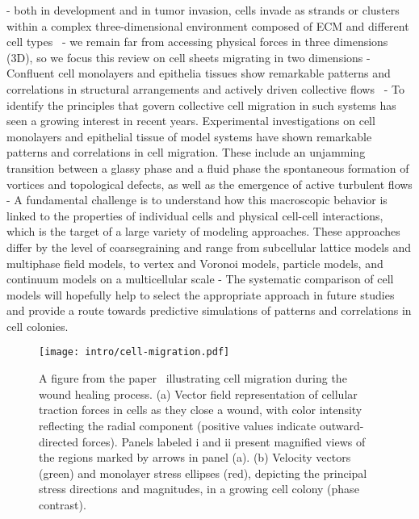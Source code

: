 - both in development and in tumor invasion, cells invade as strands or clusters within a complex three-dimensional environment composed of ECM and different cell types~\cite{friedl2009, cai2014, clark2015} 
- we remain far from accessing physical forces in three dimensions (3D), so we focus this review on cell sheets migrating in two dimensions
- Confluent cell monolayers and epithelia tissues show remarkable patterns and correlations in structural arrangements and actively driven collective flows~\cite{wenzel2021}
- To identify the principles that govern collective cell migration in such systems has seen a growing interest in recent years. Experimental investigations on cell monolayers and epithelial tissue of model systems have shown remarkable patterns and correlations in cell migration. These include an unjamming transition between a glassy phase and a fluid phase the spontaneous formation of vortices and topological defects, as well as the emergence of active turbulent flows
- A fundamental challenge is to understand how this macroscopic behavior is linked to the properties of individual cells and physical cell-cell interactions, which is the target of a large variety of modeling approaches. These approaches differ by the level of coarsegraining and range from subcellular lattice models and multiphase field models, to vertex and Voronoi models, particle models, and continuum models on a multicellular scale 
- The systematic comparison of cell models will hopefully help to select the appropriate approach in future studies and provide a route towards predictive simulations of patterns and correlations in cell colonies.
\begin{figure}[h!]
	\centering
	\texttt{[image: intro/cell-migration.pdf]}
	\caption{A figure from the paper~\cite{alert2020} illustrating cell migration during the wound healing process. 
	(a) Vector field representation of cellular traction forces in cells as they close a wound, with color intensity reflecting the radial component (positive values indicate outward-directed forces). 
	Panels labeled i and ii present magnified views of the regions marked by arrows in panel (a). 
	(b) Velocity vectors (green) and monolayer stress ellipses (red), depicting the principal stress directions and magnitudes, in a growing cell colony (phase contrast). 
	}
	\label{fig:curved_phasefield}
\end{figure}

